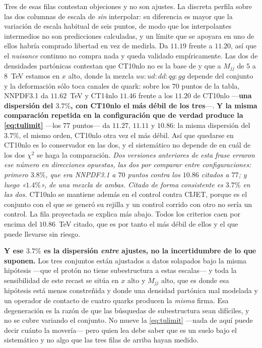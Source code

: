 \documentclass[11pt,a4paper]{article}
\begin{document}
\noindent Tres de esas filas contestan objeciones y no son ajustes. La discreta perfila sobre las
dos columnas de escala de \cite{CMSangular} \emph{sin} interpolar: su diferencia es mayor que la
variación de escala habitual de seis puntos, de modo que los interpolantes intermedios no son
predicciones calculadas, y un límite que se apoyara en uno de ellos habría comprado libertad en vez
de medirla. Da $11.19$ frente a $11.20$, así que el \emph{nuisance} continuo no compra nada y queda
validado empíricamente. Las dos de densidades partónicas contestan que CT10nlo no es la base de
\cite{CMSangular} y que a $M_{jj}$ de $5$ a $8$~TeV estamos en $x$ alto, donde la mezcla
$uu:ud:dd:qg:gg$ depende del conjunto y la deformación sólo toca canales de quark:
sobre los $70$ puntos de la tabla, NNPDF3.1 da $11.62$~TeV y CT14nlo $11.46$ frente a los $11.20$
de CT10nlo ---\textbf{una dispersión del $3.7\%$, con CT10nlo el más débil de los tres}---.
\textbf{Y la misma comparación repetida en la configuración que de verdad produce la
\eqref{eq:tulimit}} ---los $77$ puntos--- da $11.27$, $11.11$ y $10.86$: la misma dispersión del
$3.7\%$, el mismo orden, CT10nlo otra vez el más débil. Así que quedarse en CT10nlo es lo
conservador en las dos, y el sistemático no depende de en cuál de los dos $\chi^2$ se haga la
comparación. \emph{Dos versiones anteriores de esta frase erraron ese número en direcciones
opuestas, las dos por comparar entre configuraciones: primero $3.8\%$, que era NNPDF3.1 a $70$
puntos contra los $10.86$ citados a $77$; y luego «$1.4\%$», de una mezcla de ambas. Citado de
forma consistente es $3.7\%$ en las dos.} CT10nlo se mantiene
además en el control contra CIJET, porque es el conjunto con el que se generó su rejilla y un
control corrido con otro no sería un control. La fila proyectada se explica más abajo. Todos los
criterios caen por encima del $10.86$~TeV citado, que es por tanto el más débil de ellos y el que
puede llevarse sin riesgo.

\noindent\textbf{Y ese $3.7\%$ es la dispersión \emph{entre} ajustes, no la incertidumbre de lo que
suponen.} Los tres conjuntos están ajustados a datos solapados bajo la misma hipótesis ---que el
protón no tiene subestructura a estas escalas--- y toda la sensibilidad de este recast se sitúa en
$x$ alto y $M_{jj}$ alto, que es donde esa hipótesis está menos constreñida y donde una densidad
partónica mal modelada y un operador de contacto de cuatro quarks producen la \emph{misma} firma.
Esa degeneración es la razón de que las búsquedas de subestructura sean difíciles, y no se cubre
variando el conjunto. No mueve la \eqref{eq:tulimit} ---nada de aquí puede decir cuánto la
movería--- pero quien lea debe saber que es un suelo bajo el sistemático y no algo que las tres
filas de arriba hayan medido.
\end{document}
